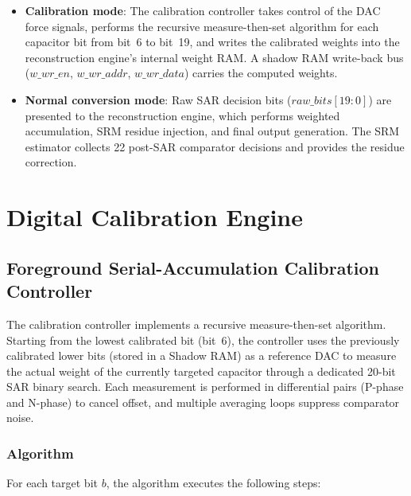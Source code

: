 \documentclass[journal]{IEEEtran}
\begin{document}
\begin{itemize}
    \item \textbf{Calibration mode}: The calibration controller takes control
          of the DAC force signals, performs the recursive measure-then-set
          algorithm for each capacitor bit from bit~6 to bit~19, and writes the
          calibrated weights into the reconstruction engine's internal weight
          RAM. A shadow RAM write-back bus ($w\_wr\_en$, $w\_wr\_addr$,
          $w\_wr\_data$) carries the computed weights.
    \item \textbf{Normal conversion mode}: Raw SAR decision bits
          ($raw\_bits[19:0]$) are presented to the reconstruction engine,
          which performs weighted accumulation, SRM residue injection, and
          final output generation. The SRM estimator collects 22 post-SAR
          comparator decisions and provides the residue correction.
\end{itemize}

\section{Digital Calibration Engine}
\label{sec:engine}

\subsection{Foreground Serial-Accumulation Calibration Controller}
\label{sec:calib_ctrl}

The calibration controller implements a recursive measure-then-set algorithm.
Starting from the lowest calibrated bit (bit~6), the controller uses the
previously calibrated lower bits (stored in a Shadow RAM) as a reference DAC
to measure the actual weight of the currently targeted capacitor through a
dedicated 20-bit SAR binary search. Each measurement is performed in
differential pairs (P-phase and N-phase) to cancel offset, and multiple
averaging loops suppress comparator noise.

\subsubsection{Algorithm}

For each target bit $b$, the algorithm executes the following steps:
\end{document}
